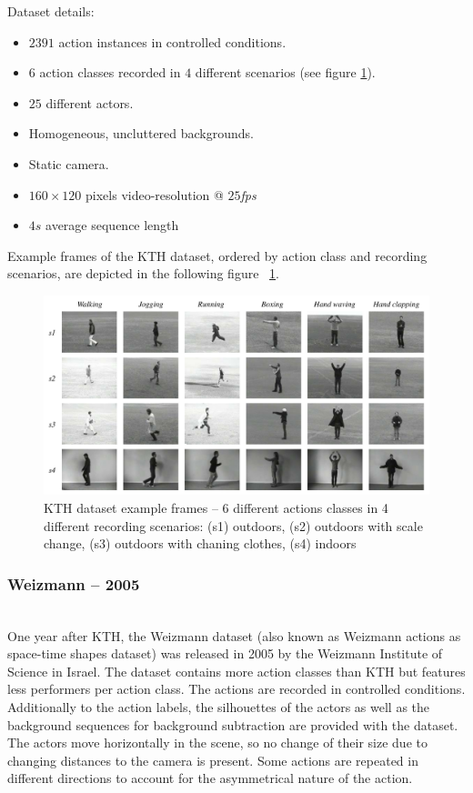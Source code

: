 Dataset details: \cite{schuldt_recognizing_2004}
\begin{itemize}
    \item $2391$ action instances in controlled conditions.
    \item $6$ action classes recorded in $4$ different scenarios (see figure \ref{fig:kth_example}).
    \item $25$ different actors.
    \item Homogeneous, uncluttered backgrounds.
    \item Static camera.
    \item $160 \times 120$ pixels video-resolution @ $25$\textit{fps}
    \item $4s$ average sequence length
\end{itemize}

Example frames of the KTH dataset, ordered by action class and recording scenarios, are depicted in the following figure ~\ref{fig:kth_example}.

\begin{figure}[H]
    \centering
    \includegraphics[width=\textwidth]{img_datasets/kth_example}
    \caption{KTH dataset example frames -- 6 different actions classes in 4 different recording scenarios: (s1) outdoors, (s2) outdoors with scale change, (s3) outdoors with chaning clothes, (s4) indoors \cite{schuldt_recognizing_2004}}
    \label{fig:kth_example}
\end{figure}


\subsubsection{Weizmann -- 2005}
\cite{blank_actions_2005}\\
One year after KTH, the Weizmann dataset (also known as Weizmann actions as space-time shapes dataset) was released in 2005 by the Weizmann Institute of Science in Israel.
The dataset contains more action classes than KTH but features less performers per action class.
The actions are recorded in controlled conditions.
Additionally to the action labels, the silhouettes of the actors as well as the background sequences for background subtraction are provided with the dataset.
The actors move horizontally in the scene, so no change of their size due to changing distances to the camera is present.
Some actions are repeated in different directions to account for the asymmetrical nature of the action. \cite{kang_review_2016}

